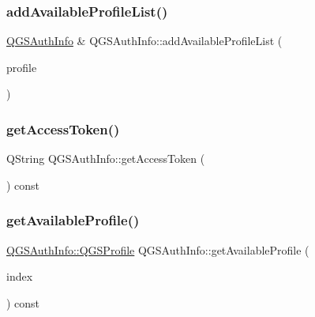 \subsubsection{\texorpdfstring{add\+Available\+Profile\+List()}{addAvailableProfileList()}}
{\footnotesize\ttfamily \mbox{\hyperlink{class_q_g_s_auth_info}{Q\+G\+S\+Auth\+Info}} \& Q\+G\+S\+Auth\+Info\+::add\+Available\+Profile\+List (\begin{DoxyParamCaption}\item[{const \mbox{\hyperlink{class_q_g_s_auth_info_1_1_q_g_s_profile}{Q\+G\+S\+Profile}} \&}]{profile }\end{DoxyParamCaption})}

\mbox{\label{class_q_g_s_auth_info_a32fa6ea3903aa1709fe251cf21c4ef1d}} 
\subsubsection{\texorpdfstring{get\+Access\+Token()}{getAccessToken()}}
{\footnotesize\ttfamily Q\+String Q\+G\+S\+Auth\+Info\+::get\+Access\+Token (\begin{DoxyParamCaption}{ }\end{DoxyParamCaption}) const}

\mbox{\label{class_q_g_s_auth_info_ab1132aa84ab91918f0c919846193b8a8}} 
\subsubsection{\texorpdfstring{get\+Available\+Profile()}{getAvailableProfile()}}
{\footnotesize\ttfamily \mbox{\hyperlink{class_q_g_s_auth_info_1_1_q_g_s_profile}{Q\+G\+S\+Auth\+Info\+::\+Q\+G\+S\+Profile}} Q\+G\+S\+Auth\+Info\+::get\+Available\+Profile (\begin{DoxyParamCaption}\item[{const int}]{index }\end{DoxyParamCaption}) const}

\mbox{\label{class_q_g_s_auth_info_a6cceb71cd4c794668bc4670fe2fe1a0e}} 
